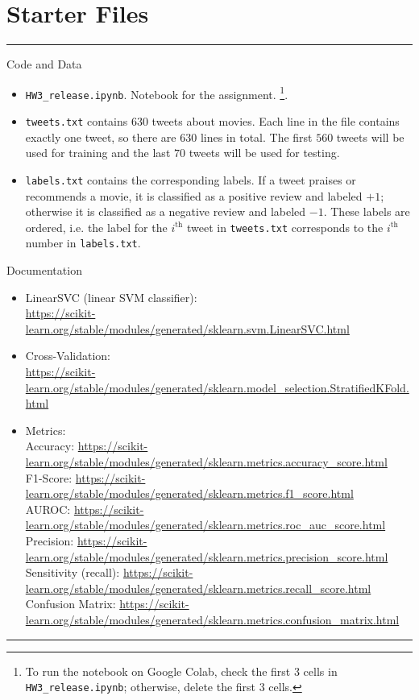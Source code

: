 \documentclass[11pt]{article}
\begin{document}
\section*{Starter Files}
\vspace{-\baselineskip}
\rule{\textwidth}{1pt}
Code and Data
\begin{itemize}[nolistsep]
    \item \verb|HW3_release.ipynb|. Notebook for the assignment. \footnote{To run the notebook on Google Colab, check the first 3 cells in \verb|HW3_release.ipynb|; otherwise, delete the first 3 cells.}.
    \item \verb|tweets.txt| contains 630 tweets about movies. Each line in the file contains exactly one tweet, so there are 630 lines in total. The first $560$ tweets will be used for training and the last $70$ tweets will be used for testing.
    \item \verb|labels.txt| contains the corresponding labels. If a tweet praises or recommends a movie, it is classified as a positive review and labeled $+1$; otherwise it is classified as a negative review and labeled $-1$. These labels are ordered, i.e. the label for the $i^\textrm{th}$ tweet in \verb|tweets.txt| corresponds to the $i^\textrm{th}$ number in \verb|labels.txt|.
\end{itemize}
Documentation
\begin{itemize}[nolistsep]
\item LinearSVC (linear SVM classifier): \\{\footnotesize \url{https://scikit-learn.org/stable/modules/generated/sklearn.svm.LinearSVC.html}}
\item Cross-Validation: \\{\footnotesize \url{https://scikit-learn.org/stable/modules/generated/sklearn.model_selection.StratifiedKFold.html}}
\item Metrics: 
\\ Accuracy: {\footnotesize \url{https://scikit-learn.org/stable/modules/generated/sklearn.metrics.accuracy_score.html}}
\\ F1-Score: {\footnotesize \url{https://scikit-learn.org/stable/modules/generated/sklearn.metrics.f1_score.html}}
\\ AUROC: {\footnotesize \url{https://scikit-learn.org/stable/modules/generated/sklearn.metrics.roc_auc_score.html}}
\\ Precision: {\footnotesize \url{https://scikit-learn.org/stable/modules/generated/sklearn.metrics.precision_score.html}}
\\ Sensitivity (recall): {\footnotesize \url{https://scikit-learn.org/stable/modules/generated/sklearn.metrics.recall_score.html}}
\\ Confusion Matrix: {\footnotesize \url{https://scikit-learn.org/stable/modules/generated/sklearn.metrics.confusion_matrix.html}}
\end{itemize}
\vspace{-\baselineskip}
\rule{\textwidth}{1pt}
\end{document}
